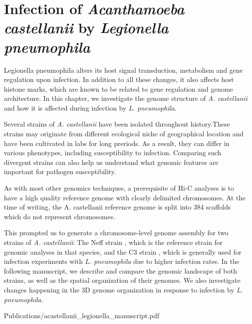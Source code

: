 
\chapter{Infection of \textit{Acanthamoeba castellanii} by \textit{Legionella pneumophila}} %

\label{ch:02-02} %


Legionella pneumophila alters its host signal transduction, metabolism and gene regulation upon infection. In addition to all these changes, it also affects host histone marks, which are known to be related to gene regulation and genome architecture. In this chapter, we investigate the genome structure of \textit{A. castellanii} and how it is affected during infection by \textit{L. pneumophila}.

Several strains of \textit{A. castellanii} have been isolated throughout history.These strains may originate from different ecological niche of geographical location and have been cultivated in labs for long preriods. As a result, they can differ in various phenotypes, including susceptibility to infection. Comparing such divergent strains can also help us understand what genomic features are important for pathogen susceptibility.

As with most other genomics techniques, a prerequisite of Hi-C analyses is to have a high quality reference genome with clearly delimited chromosomes. At the time of writing, the A. castellanii reference genome is split into 384 scaffolds which do not represent chromosomes.

This prompted us to generate a chromosome-level genome assembly for two strains of \textit{A. castellanii}: The Neff strain \cite{neffPurificationAxenicCultivation1957}, which is the reference strain for genomic analyses in that species, and the C3 strain \cite{michelIsolationAcanthamoebaStrain1997}, which is generally used for infection experiments with \textit{L. pneumophila} due to higher infection rates. In the following manuscript, we describe and compare the genomic landscape of both strains, as well as the spatial organization of their genomes. We also investigate changes happening in the 3D genome organization in response to infection by \textit{L. pneumophila}.


     {Publications/acastellanii_legionella_manuscript.pdf}    

